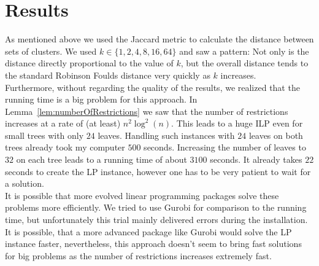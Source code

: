 \section{Results}
As mentioned above we used the Jaccard metric to calculate the distance between sets of clusters. We used $k \in \{1,2,4,8,16,64\}$ and saw a pattern: Not only is the distance directly proportional to the value of $k$, but the overall distance tends to the standard Robinson Foulds distance very quickly as $k$ increases. \\
Furthermore, without regarding the quality of the results, we realized that the running time is a big problem for this approach. In Lemma~\ref{lem:numberOfRestrictions} we saw that the number of restrictions increases at a rate of (at least) $n^2\log^2(n)$. This leads to a huge ILP even for small trees with only $24$ leaves. Handling such instances with $24$ leaves on both trees already took my computer $500$ seconds. Increasing the number of leaves to $32$ on each tree leads to a running time of about $3100$ seconds. It already takes $22$ seconds to create the LP instance, however one has to be very patient to wait for a solution.\\
It is possible that more evolved linear programming packages solve these problems more efficiently. We tried to use Gurobi for comparison to the running time, but unfortunately this trial mainly delivered errors during the installation. It is possible, that a more advanced package like Gurobi would solve the LP instance faster, nevertheless, this approach doesn't seem to bring fast solutions for big problems as the number of restrictions increases extremely fast.